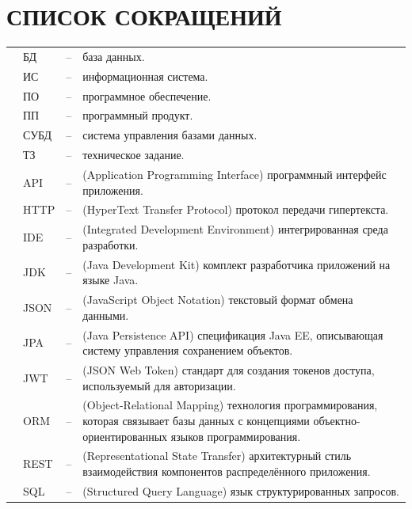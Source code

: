 \sectionbreak \section*{ 
	\gostTitleFont
	\redline
	СПИСОК СОКРАЩЕНИЙ
}
\titlespace

{\gostFont
	
	\begin{tabular}{p{0.85cm} p{1.75cm} p{0.3cm} p{131.5mm}}
		& БД & {--} & база данных. \\
		& ИС & {--} & информационная система. \\
		& ПО & {--} & программное обеспечение. \\
		& ПП & {--} & программный продукт. \\
		& СУБД & {--} & система управления базами данных. \\
		& ТЗ & {--} & техническое задание. \\
		& API & {--} & (Application Programming Interface) программный интерфейс приложения. \\
		& HTTP & {--} & (HyperText Transfer Protocol) протокол передачи гипертекста. \\
		& IDE & {--} & (Integrated Development Environment) интегрированная среда разработки. \\
		& JDK & {--} & (Java Development Kit) комплект разработчика приложений на языке Java. \\
		& JSON & {--} & (JavaScript Object Notation) текстовый формат обмена данными. \\
		& JPA & {--} & (Java Persistence API) спецификация Java EE, описывающая систему управления сохранением объектов. \\
		& JWT & {--} & (JSON Web Token) стандарт для создания токенов доступа, используемый для авторизации. \\
		& ORM & {--} & (Object-Relational Mapping) технология программирования, которая связывает базы данных с концепциями объектно-ориентированных языков программирования. \\
		& REST & {--} & (Representational State Transfer) архитектурный стиль взаимодействия компонентов распределённого приложения. \\
		& SQL & {--} & (Structured Query Language) язык структурированных запросов. \\
	\end{tabular}
	
}